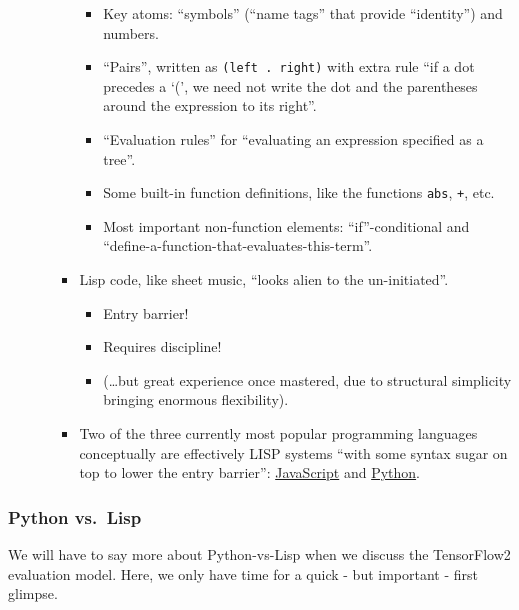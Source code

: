 \documentclass[11pt]{article}
\providecommand{\tightlist}{%
      \setlength{\itemsep}{0pt}\setlength{\parskip}{0pt}}
\begin{document}
\begin{itemize}
\begin{itemize}
\begin{itemize}
      \begin{itemize}
      \item
        Key atoms: ``symbols'' (``name tags'' that provide ``identity'')
        and numbers.
      \item
        ``Pairs'', written as \texttt{(left\ .\ right)} with extra rule
        ``if a dot precedes a `(', we need not write the dot and the
        parentheses around the expression to its right''.
      \item
        ``Evaluation rules'' for ``evaluating an expression specified as
        a tree''.
      \item
        Some built-in function definitions, like the functions
        \texttt{abs}, \texttt{+}, etc.
      \item
        Most important non-function elements: ``if''-conditional and
        ``define-a-function-that-evaluates-this-term''.
      \end{itemize}
    \item
      Lisp code, like sheet music, ``looks alien to the un-initiated''.

      \begin{itemize}
      \tightlist
      \item
        Entry barrier!
      \item
        Requires discipline!
      \item
        (\ldots but great experience once mastered, due to structural
        simplicity bringing enormous flexibility).
      \end{itemize}
    \item
      Two of the three currently most popular programming languages
      conceptually are effectively LISP systems ``with some syntax sugar
      on top to lower the entry barrier'':
      \href{https://thenewstack.io/brendan-eich-on-creating-javascript-in-10-days-and-what-hed-do-differently-today/}{JavaScript}
      and \href{https://norvig.com/python-lisp.html\#sample}{Python}.
    \end{itemize}
  \end{itemize}
\end{itemize}

\hypertarget{python-vs.-lisp}{%
\subsubsection{Python vs.~Lisp}\label{python-vs.-lisp}}

We will have to say more about Python-vs-Lisp when we discuss the
TensorFlow2 evaluation model. Here, we only have time for a quick - but
important - first glimpse.
\end{document}
